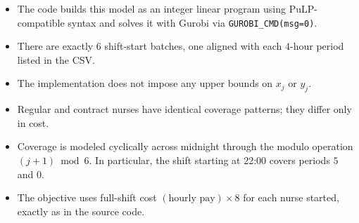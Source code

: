 \begin{itemize}
    \item The code builds this model as an integer linear program using PuLP-compatible syntax and solves it with Gurobi via \texttt{GUROBI\_CMD(msg=0)}.
    \item There are exactly 6 shift-start batches, one aligned with each 4-hour period listed in the CSV.
    \item The implementation does not impose any upper bounds on \(x_j\) or \(y_j\).
    \item Regular and contract nurses have identical coverage patterns; they differ only in cost.
    \item Coverage is modeled cyclically across midnight through the modulo operation \((j+1)\bmod 6\). In particular, the shift starting at 22:00 covers periods \(5\) and \(0\).
    \item The objective uses full-shift cost \( (\text{hourly pay}) \times 8 \) for each nurse started, exactly as in the source code.
\end{itemize}
